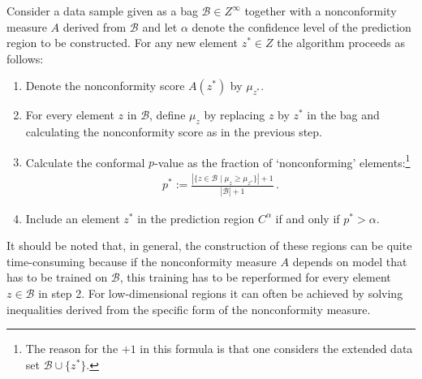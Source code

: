     \begin{construct}\label{data:cp}
        Consider a data sample given as a bag $\mathcal{B}\in Z^\infty$ together with a nonconformity measure $A$ derived from $\mathcal{B}$ and let $\alpha$ denote the confidence level of the prediction region to be constructed. For any new element $z^*\in Z$ the algorithm proceeds as follows:
        \begin{enumerate}
            \item Denote the nonconformity score $A(z^*)$ by $\mu_{z^*}$.
            \item For every element $z$ in $\mathcal{B}$, define $\mu_z$ by replacing $z$ by $z^*$ in the bag and calculating the nonconformity score as in the previous step.
            \item Calculate the conformal $p$-value as the fraction of `nonconforming' elements:\footnote{The reason for the $+1$ in this formula is that one considers the extended data set $\mathcal{B}\cup\{z^*\}$.}
                \begin{gather}
                    \label{data:tcp}
                    p^* := \frac{|\{z\in\mathcal{B}\mid\mu_z\geq\mu_{z^*}\}|+1}{|\mathcal{B}|+1}\,.
                \end{gather}
            \item Include an element $z^*$ in the prediction region $C^\alpha$ if and only if $p^*>\alpha$.
        \end{enumerate}
        It should be noted that, in general, the construction of these regions can be quite time-consuming because if the nonconformity measure $A$ depends on model that has to be trained on $\mathcal{B}$, this training has to be reperformed for every element $z\in\mathcal{B}$ in step 2. For low-dimensional regions it can often be achieved by solving inequalities derived from the specific form of the nonconformity measure.
    \end{construct}

